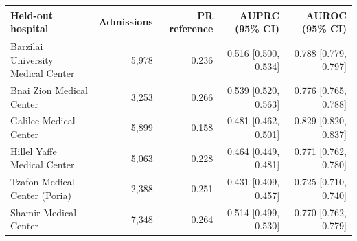 \begin{tabular}{lrrrr}
\toprule
Held-out hospital & Admissions & PR reference & AUPRC (95\% CI) & AUROC (95\% CI) \\
\midrule
Barzilai University Medical Center & 5,978 & 0.236 & 0.516 [0.500, 0.534] & 0.788 [0.779, 0.797] \\
Bnai Zion Medical Center & 3,253 & 0.266 & 0.539 [0.520, 0.563] & 0.776 [0.765, 0.788] \\
Galilee Medical Center & 5,899 & 0.158 & 0.481 [0.462, 0.501] & 0.829 [0.820, 0.837] \\
Hillel Yaffe Medical Center & 5,063 & 0.228 & 0.464 [0.449, 0.481] & 0.771 [0.762, 0.780] \\
Tzafon Medical Center (Poria) & 2,388 & 0.251 & 0.431 [0.409, 0.457] & 0.725 [0.710, 0.740] \\
Shamir Medical Center & 7,348 & 0.264 & 0.514 [0.499, 0.530] & 0.770 [0.762, 0.779] \\
\bottomrule
\end{tabular}
